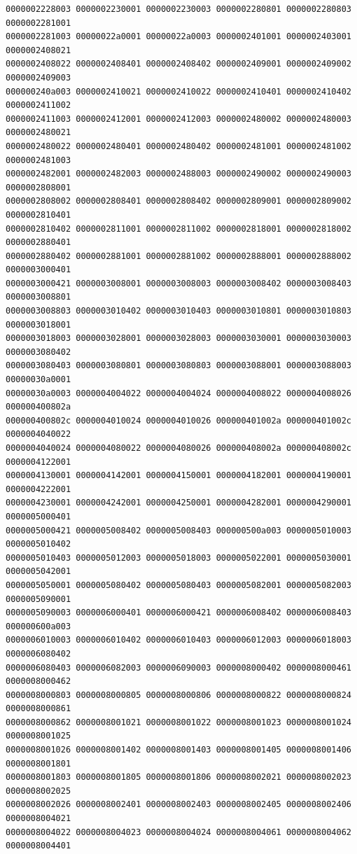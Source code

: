 \begin{Verbatim}[fontsize=\scriptsize]
0000002228003 0000002230001 0000002230003 0000002280801 0000002280803 0000002281001
0000002281003 00000022a0001 00000022a0003 0000002401001 0000002403001 0000002408021
0000002408022 0000002408401 0000002408402 0000002409001 0000002409002 0000002409003
000000240a003 0000002410021 0000002410022 0000002410401 0000002410402 0000002411002
0000002411003 0000002412001 0000002412003 0000002480002 0000002480003 0000002480021
0000002480022 0000002480401 0000002480402 0000002481001 0000002481002 0000002481003
0000002482001 0000002482003 0000002488003 0000002490002 0000002490003 0000002808001
0000002808002 0000002808401 0000002808402 0000002809001 0000002809002 0000002810401
0000002810402 0000002811001 0000002811002 0000002818001 0000002818002 0000002880401
0000002880402 0000002881001 0000002881002 0000002888001 0000002888002 0000003000401
0000003000421 0000003008001 0000003008003 0000003008402 0000003008403 0000003008801
0000003008803 0000003010402 0000003010403 0000003010801 0000003010803 0000003018001
0000003018003 0000003028001 0000003028003 0000003030001 0000003030003 0000003080402
0000003080403 0000003080801 0000003080803 0000003088001 0000003088003 00000030a0001
00000030a0003 0000004004022 0000004004024 0000004008022 0000004008026 000000400802a
000000400802c 0000004010024 0000004010026 000000401002a 000000401002c 0000004040022
0000004040024 0000004080022 0000004080026 000000408002a 000000408002c 0000004122001
0000004130001 0000004142001 0000004150001 0000004182001 0000004190001 0000004222001
0000004230001 0000004242001 0000004250001 0000004282001 0000004290001 0000005000401
0000005000421 0000005008402 0000005008403 000000500a003 0000005010003 0000005010402
0000005010403 0000005012003 0000005018003 0000005022001 0000005030001 0000005042001
0000005050001 0000005080402 0000005080403 0000005082001 0000005082003 0000005090001
0000005090003 0000006000401 0000006000421 0000006008402 0000006008403 000000600a003
0000006010003 0000006010402 0000006010403 0000006012003 0000006018003 0000006080402
0000006080403 0000006082003 0000006090003 0000008000402 0000008000461 0000008000462
0000008000803 0000008000805 0000008000806 0000008000822 0000008000824 0000008000861
0000008000862 0000008001021 0000008001022 0000008001023 0000008001024 0000008001025
0000008001026 0000008001402 0000008001403 0000008001405 0000008001406 0000008001801
0000008001803 0000008001805 0000008001806 0000008002021 0000008002023 0000008002025
0000008002026 0000008002401 0000008002403 0000008002405 0000008002406 0000008004021
0000008004022 0000008004023 0000008004024 0000008004061 0000008004062 0000008004401

\end{Verbatim}
